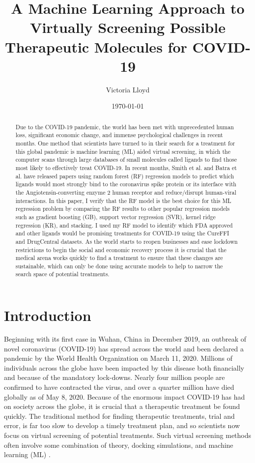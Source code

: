 \documentclass[11pt]{article}
\title{A Machine Learning Approach to Virtually Screening Possible Therapeutic Molecules for COVID-19}
\author{Victoria Lloyd}
\date{\today}
\begin{document}
\maketitle

\begin{abstract}

   Due to the COVID-19 pandemic, the world has been met with unprecedented human loss, significant economic change, and immense psychological challenges in recent months. One method that scientists have turned to in their search for a treatment for this global pandemic is machine learning (ML) aided virtual screening, in which the computer scans through large databases of small molecules called ligands to find those most likely to effectively treat COVID-19. In recent months, Smith et al. and Batra et al. have released papers using random forest (RF) regression models to predict which ligands would most strongly bind to the coronavirus spike protein or its interface with the Angiotensin-converting enzyme 2 human receptor and reduce/disrupt human-viral interactions. In this paper, I verify that the RF model is the best choice for this ML regression problem by comparing the RF results to other popular regression models such as gradient boosting (GB), support vector regression (SVR), kernel ridge regression (KR), and stacking. I used my RF model to identify which FDA approved and other ligands would be promising treatments for COVID-19 using the CureFFI and DrugCentral datasets. As the world starts to reopen businesses and ease lockdown restrictions to begin the social and economic recovery process it is crucial that the medical arena works quickly to find a treatment to ensure that these changes are sustainable, which can only be done using accurate models to help to narrow the search space of potential treatments.
   
\end{abstract}
  
  \section{Introduction}
  Beginning with its first case in Wuhan, China in December 2019, an outbreak of novel coronavirus (COVID-19) has spread across the world and been declared a pandemic by the World Health Organization on March 11, 2020. Millions of individuals across the globe have been impacted by this disease both financially and because of the mandatory lock-downs. Nearly four million people are confirmed to have contracted the virus, and over a quarter million have died globally as of May 8, 2020. Because of the enormous impact COVID-19 has had on society across the globe, it is crucial that a therapeutic treatment be found quickly. The traditional method for finding therapeutic treatments, trial and error, is far too slow to develop a timely treatment plan, and so scientists now focus on virtual screening of potential treatments. Such virtual screening methods often involve some combination of theory, docking simulations, and machine learning (ML) \cite{mlmodels}. 
  
\end{document}
